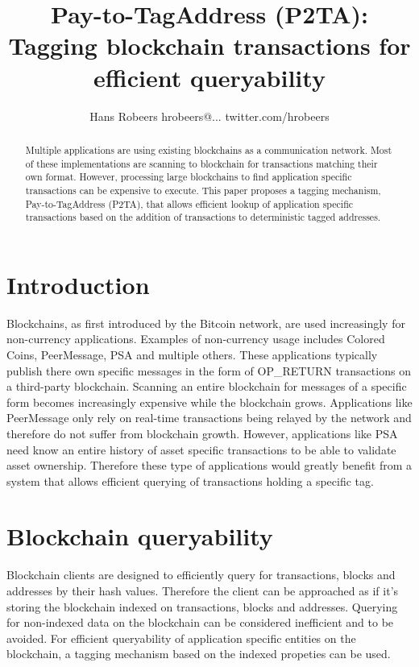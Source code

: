 \documentclass[a4paper,10pt]{article}
\title{Pay-to-TagAddress (P2TA): Tagging blockchain transactions for efficient queryability}
\author{Hans Robeers hrobeers@... twitter.com/hrobeers}
\begin{document}
\maketitle

\begin{abstract}
Multiple applications are using existing blockchains as a communication network.
Most of these implementations are scanning to blockchain for transactions matching their own format.
However, processing large blockchains to find application specific transactions can be expensive to execute.
This paper proposes a tagging mechanism, Pay-to-TagAddress (P2TA), that allows efficient lookup of application specific transactions based on the addition of transactions to deterministic tagged addresses.
\end{abstract}

\section{Introduction}
Blockchains, as first introduced by the Bitcoin\cite{Nak09} network, are used increasingly for non-currency applications.
Examples of non-currency usage includes Colored Coins\cite{Ros12}, PeerMessage\cite{Emeth}, PSA\cite{Pchem} and multiple others.
These applications typically publish there own specific messages in the form of OP\_RETURN transactions on a third-party blockchain.
Scanning an entire blockchain for messages of a specific form becomes increasingly expensive while the blockchain grows.
Applications like PeerMessage\cite{Emeth} only rely on real-time transactions being relayed by the network and therefore do not suffer from blockchain growth.
However, applications like PSA\cite{Pchem} need know an entire history of asset specific transactions to be able to validate asset ownership.
Therefore these type of applications would greatly benefit from a system that allows efficient querying of transactions holding a specific tag.

\section{Blockchain queryability}
Blockchain clients are designed to efficiently query for transactions, blocks and addresses by their hash values.
Therefore the client can be approached as if it's storing the blockchain indexed on transactions, blocks and addresses.
Querying for non-indexed data on the blockchain can be considered inefficient and to be avoided.
For efficient queryability of application specific entities on the blockchain, a tagging mechanism based on the indexed propeties can be used.
\end{document}
